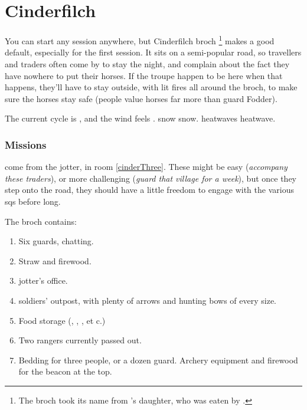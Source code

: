 \section{Cinderfilch }
\label{cinderfilch}



\begin{multicols}{2}

\noindent
You can start any session anywhere, but Cinderfilch \gls{broch}%
\footnote{The \gls{broch} took its name from 's daughter, who was eaten by .}
makes a good default, especially for the first session.
It sits on a semi-popular road, so travellers and traders often come by to stay the night, and complain about the fact they have nowhere to put their horses.
If the troupe happen to be here when that happens, they'll have to stay outside, with lit fires all around the \gls{broch}, to make sure the horses stay safe (people value horses far more than \gls{guard} Fodder).

The current \gls{cycle} is \showCycle, and the wind feels \showTemperature.
\ifcase\value{temperature}%
  \Gls{snow} \glsdesc{snow}.
\or%
\or%
\else%
  \Glspl{heatwave} \glsdesc{heatwave}.
\fi%

\subsubsection{Missions}
come from the \gls{jotter}, in room \ref{cinderThree}.%
These might be easy (\textit{accompany these traders}), or more challenging (\textit{guard that \gls{village} for a week}), but once they step onto the road, they should have a little freedom to engage with the various \glspl{sq} before long.

The \gls{broch} contains:

\begin{enumerate}
  \item
  Six \glspl{guard}, chatting.
  \label{cinderBase}
  \item
  Straw and firewood.
  \label{cinderStraw}
  \item
  \Gls{jotter}'s office.
  \label{cinderOffice}
  \item
  \Glspl{soldier}' outpost, with plenty of arrows and hunting bows of every size.
  \label{cinderBows}
  \item
  Food storage (\rations, \rations, \rations, et c.)
  \label{cinderFood}
  \item
  Two \glspl{ranger} currently passed out.
  \label{cinderUpper}
  \item
  Bedding for three people, or a dozen \gls{guard}.
  Archery equipment and firewood for the beacon at the top.
  \label{cinderBeds}
\end{enumerate}

\end{multicols}
